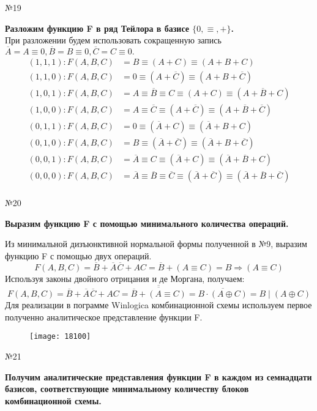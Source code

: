 \documentclass[]{article}
\begin{document}
	\begin{center}\begin{large}{№19}\end{large}\end{center}
	\textbf{Разложим функцию F в ряд Тейлора в базисе $\{0,\equiv,+\}$.\\}
	При разложении будем использовать сокращенную запись $\overline{A}=A\equiv 0,\overline{B} = B\equiv0,\overline{C}=C\equiv0.$
	\begin{align*}
	(1,1,1):F(A,B,C)&=B\equiv(A+C)\equiv(A+B+C)\\
	(1,1,0):F(A,B,C)&=0\equiv(A+\overline{C})\equiv(A+B+\overline C)\\
	(1,0,1):F(A,B,C)&=A\equiv\overline{B}\equiv C\equiv(A+C)\equiv(A+\overline{B}+C)\\
	(1,0,0):F(A,B,C)&=A\equiv\overline{C}\equiv(A+\overline{C})\equiv(A+\overline{B}+\overline{C})\\
	(0,1,1):F(A,B,C)&=0\equiv(\overline{A}+C)\equiv(\overline{A}+B+C)\\
	(0,1,0):F(A,B,C)&=B\equiv(\overline{A}+\overline{C})\equiv(\overline{A}+B+\overline{C})\\
	(0,0,1):F(A,B,C)&=\overline{A}\equiv C\equiv(\overline{A}+C)\equiv(\overline{A}+\overline{B}+C)
	\\
	(0,0,0):F(A,B,C)&=\overline{A}\equiv\overline{B}\equiv\overline{C}\equiv(\overline{A}+\overline{C})\equiv(\overline{A}+\overline{B}+\overline{C})\\
	\end{align*}
	\begin{center}\begin{large}{№20}\end{large}\end{center}
	\textbf{Выразим функцию F с помощью минимального количества операций.}
	
	Из минимальной дизъюнктивной нормальной формы полученной в №9, выразим функцию F  с помощью двух операций.
	\[
	F(A,B,C)=\overline{B} + \overline{A}\hspace{1pt}\overline{C}+AC=\overline{B} + (A\equiv C)=B\Rightarrow(A\equiv C)
	\]
	Используя законы двойного отрицания и де Моргана, получаем:
	\[
	F(A,B,C)=\overline{B} + \overline{A}\hspace{1pt}\overline{C}+AC=\overline{\overline{\overline{B}+(A\equiv C)}}=\overline{B\cdot(A\oplus C)}=B\mid(A\oplus C)
	\]
	Для реализации в пограмме Winlogica комбинационной схемы используем первое полученно аналитическое представление функции F.
	\begin{figure}[h]
		\centering
		\texttt{[image: 18100]}
	\end{figure}
	\newpage
	\begin{center}\begin{large}{№21}\end{large}\end{center}
	\textbf{Получим аналитические представления функции F в каждом из семнадцати базисов, соответствующие минимальному количеству блоков комбинационной схемы.}
\end{document}
